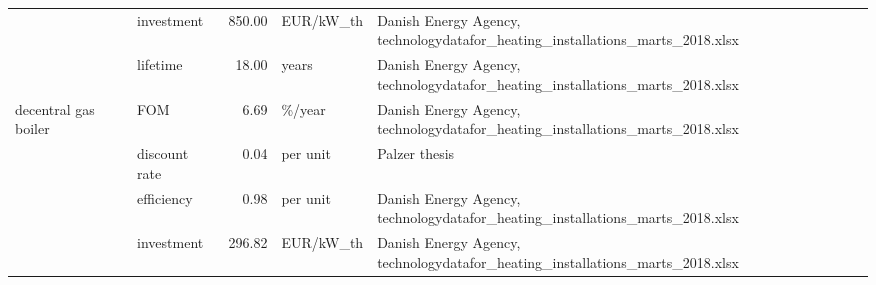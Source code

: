 \begin{longtable}{p{5cm}p{3cm}rp{3cm}p{11cm}}
                      & investment &         850.00 &                         EUR/kW\_th &                                                                                                                                                                                                                                                        Danish Energy Agency, technologydatafor\_heating\_installations\_marts\_2018.xlsx \\
                      & lifetime &          18.00 &                             years &                                                                                                                                                                                                                                                        Danish Energy Agency, technologydatafor\_heating\_installations\_marts\_2018.xlsx \\
decentral gas boiler & FOM &           6.69 &                            \%/year &                                                                                                                                                                                                                                                        Danish Energy Agency, technologydatafor\_heating\_installations\_marts\_2018.xlsx \\
                      & discount rate &           0.04 &                          per unit &                                                                                                                                                                                                                                                                                                                        Palzer thesis \\
                      & efficiency &           0.98 &                          per unit &                                                                                                                                                                                                                                                        Danish Energy Agency, technologydatafor\_heating\_installations\_marts\_2018.xlsx \\
                      & investment &         296.82 &                         EUR/kW\_th &                                                                                                                                                                                                                                                        Danish Energy Agency, technologydatafor\_heating\_installations\_marts\_2018.xlsx \\

\end{longtable}
